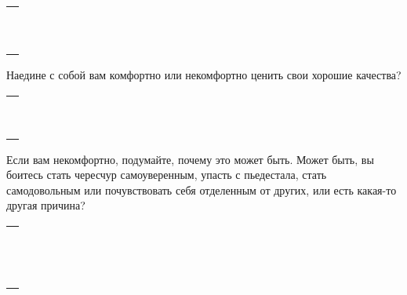 \setlength{\extrarowheight}{2mm}
\begin{tabularx}{\textwidth}{X}
	\\
	\arrayrulecolor{gray}\hline\\
	\hline\\
	\hline\\
	\hline\\
	\hline\\
	\hline\\	
	\hline\\
	\hline\\
	\hline\\
	\hline\\
	\hline\\
\end{tabularx}
\setlength{\extrarowheight}{0mm}
\begin{itemize}
	\itemWritingHand Наедине с собой вам комфортно или некомфортно ценить свои хорошие качества?
\end{itemize}

\setlength{\extrarowheight}{2mm}
\begin{tabularx}{\textwidth}{X}
	\\
	\arrayrulecolor{gray}\hline\\
	\hline\\
	\hline\\
	\hline\\
	\hline\\
	\hline\\	
	\hline\\
	\hline\\
	\hline\\
	\hline\\
\end{tabularx}
\setlength{\extrarowheight}{0mm}
\begin{itemize}
	\itemWritingHand Если вам некомфортно, подумайте, почему это может быть. Может быть, вы боитесь стать чересчур самоуверенным, упасть с пьедестала, стать самодовольным или почувствовать себя отделенным от других, или есть какая-то другая причина?
\end{itemize}

\setlength{\extrarowheight}{2mm}
\begin{tabularx}{\textwidth}{X}
	\\
	\arrayrulecolor{gray}\hline\\
	\hline\\
	\hline\\
	\hline\\
	\hline\\
	\hline\\	
	\hline\\
	\hline\\
	\hline\\
	\hline\\
	\hline\\
	\hline\\
	\hline\\
	\hline\\
\end{tabularx}
\setlength{\extrarowheight}{0mm}

